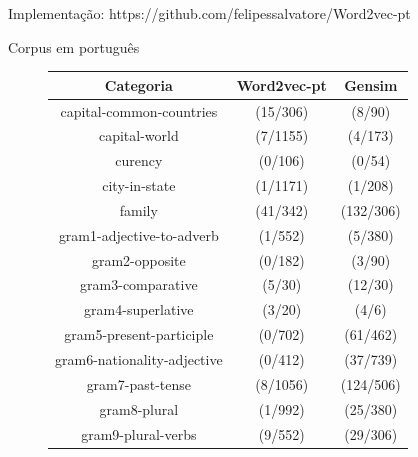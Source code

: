 \documentclass{beamer}
\begin{document}
\begin{frame}[fragile]{Implementação: https://github.com/felipessalvatore/Word2vec-pt}
\begin{center}
\small{Corpus em português}
\end{center}
\small{
\begin{figure}
\begin{center}
\begin{tabular}{|c|c|c|}
\hline
\cellcolor{blue!40}Categoria & \cellcolor{blue!40}Word2vec-pt & \cellcolor{blue!40}Gensim  \\ \hline
\cellcolor{blue!10}capital-common-countries & \cellcolor{green!20}(15/306) &  \cellcolor{green!20}(8/90) \\ \hline
\cellcolor{blue!10}capital-world &  \cellcolor{green!20}(7/1155) & \cellcolor{green!20} (4/173) \\ \hline
\cellcolor{blue!10}curency & \cellcolor{green!20} (0/106) &  \cellcolor{green!20}(0/54) \\ \hline
\cellcolor{blue!10}city-in-state & \cellcolor{green!20} (1/1171) &  \cellcolor{green!20}(1/208) \\ \hline
\cellcolor{blue!10}family &  \cellcolor{red!20}(41/342) & \cellcolor{red!20}(132/306) \\ \hline
\cellcolor{blue!10}gram1-adjective-to-adverb &  \cellcolor{red!20}(1/552) & \cellcolor{red!20}(5/380)  \\ \hline
\cellcolor{blue!10}gram2-opposite &  \cellcolor{red!20}(0/182) &\cellcolor{red!20}(3/90) \\ \hline
\cellcolor{blue!10}gram3-comparative &  \cellcolor{red!20}(5/30) & \cellcolor{red!20}(12/30) \\ \hline
\cellcolor{blue!10}gram4-superlative &  \cellcolor{red!20}(3/20) & \cellcolor{red!20}(4/6) \\ \hline
\cellcolor{blue!10}gram5-present-participle & \cellcolor{red!20} (0/702) & \cellcolor{red!20}(61/462) \\ \hline
\cellcolor{blue!10}gram6-nationality-adjective & \cellcolor{red!20}(0/412) & \cellcolor{red!20}(37/739) \\ \hline
\cellcolor{blue!10}gram7-past-tense &  \cellcolor{red!20}(8/1056) & \cellcolor{red!20}(124/506) \\ \hline
\cellcolor{blue!10}gram8-plural & \cellcolor{red!20} (1/992) &\cellcolor{red!20} (25/380) \\ \hline
\cellcolor{blue!10}gram9-plural-verbs &  \cellcolor{red!20}(9/552) & \cellcolor{red!20}(29/306)
\end{tabular}
\end{center}
\end{figure}
}
\end{frame}
\end{document}
